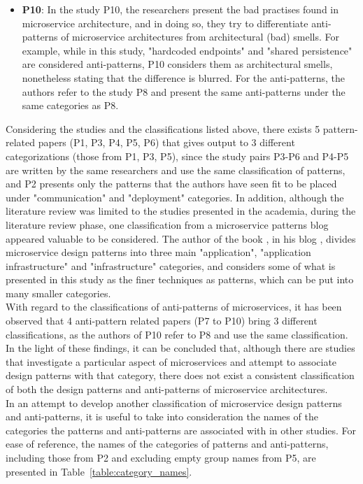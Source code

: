 \documentclass{Configuration_Files/PoliMi3i_thesis}
\begin{document}
\begin{itemize}
    \item \textbf{P10}: In the study P10, the researchers present the bad practises found in microservice architecture, and in doing so, they try to differentiate anti-patterns of microservice architectures from architectural (bad) smells.
    For example, while in this study, "hardcoded endpoints" and "shared persistence" are considered anti-patterns, P10 considers them as architectural smells, nonetheless stating that the difference is blurred.
    For the anti-patterns, the authors refer to the study P8 and present the same anti-patterns under the same categories as P8.
\end{itemize}

Considering the studies and the classifications listed above, there exists 5 pattern-related papers (P1, P3, P4, P5, P6) that gives output to 3 different categorizations (those from P1, P3, P5), since the study pairs P3-P6 and P4-P5 are written by the same researchers and use the same classification of patterns, and P2 presents only the patterns that the authors have seen fit to be placed under "communication" and "deployment" categories.
In addition, although the literature review was limited to the studies presented in the academia, during the literature review phase, one classification from a microservice patterns blog appeared valuable to be considered.
The author of the book \cite{twopc}, in his blog \cite{blogtaxonomy}, divides microservice design patterns into three main "application", "application infrastructure" and "infrastructure" categories, and considers some of what is presented in this study as the finer techniques as patterns, which can be put into many smaller categories.
\\
With regard to the classifications of anti-patterns of microservices, it has been observed that 4 anti-pattern related papers (P7 to P10) bring 3 different classifications, as the authors of P10 refer to P8 and use the same classification.
\\
In the light of these findings, it can be concluded that, although there are studies that investigate a particular aspect of microservices and attempt to associate design patterns with that category, there does not exist a consistent classification of both the design patterns and anti-patterns of microservice architectures.
\\
In an attempt to develop another classification of microservice design patterns and anti-patterns, it is useful to take into consideration the names of the categories the patterns and anti-patterns are associated with in other studies.
For ease of reference, the names of the categories of patterns and anti-patterns, including those from P2 and excluding empty group names from P5, are presented in Table~\ref{table:category_names}. 
\end{document}
